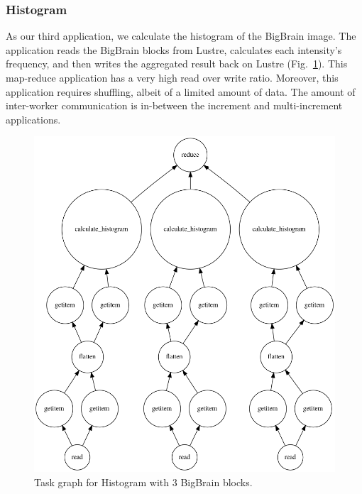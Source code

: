 \documentclass[conference]{IEEEtran}
\begin{document}
\subsubsection{Histogram}
As our third application, we calculate the histogram of the BigBrain image. 
The application reads the BigBrain blocks from Lustre, calculates each intensity's frequency, and then writes the aggregated result back on Lustre (Fig.~\ref{fig:graph-histogram}).
This map-reduce application has a very high read over write ratio.
Moreover, this application requires shuffling, albeit of a limited amount of data. 
The amount of inter-worker communication is in-between the increment and multi-increment applications.
\begin{figure}[!hb]
	\centering
	\includegraphics[height=\columnwidth,
	angle=0]{figures/histogram.png}
	\caption{Task graph for Histogram with 3 BigBrain blocks.}
	\label{fig:graph-histogram}
\end{figure}
			
\end{document}
